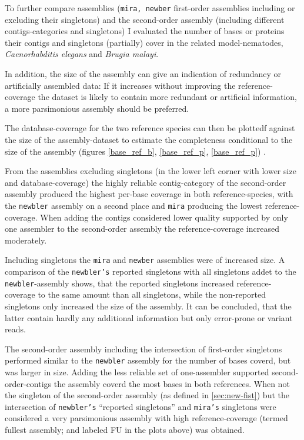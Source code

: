 To further compare assemblies (\texttt{mira, newber} first-order
assemblies including or excluding their singletons) and the
second-order assembly (including different contigs-categories and
singletons) I evaluated the number of bases or proteins their contigs
and singletons (partially) cover in the related model-nematodes,
\textit{Caenorhabditis elegans} and \textit{Brugia malayi}. 

In addition, the size of the assembly can give an indication of
redundancy or artificially assembled data: If it increases without
improving the reference-coverage the dataset is likely to contain
more redundant or artificial information, a more parsimonious assembly
should be preferred.

The database-coverage for the two reference species can then be
plottedf against the size of the assembly-dataset to estimate the
completeness conditional to the size of the assembly (figures
\ref{base_ref_b}, \ref{base_ref_p}, \ref{base_ref_p}) .

From the assemblies excluding singletons (in the lower left corner
with lower size and database-coverage) the highly reliable
contig-category of the second-order assembly produced the highest
per-base coverage in both reference-species, with the \texttt{newbler}
assembly on a second place and \texttt{mira} producing the lowest
reference-coverage. When adding the contigs considered lower quality
supported by only one assembler to the second-order assembly the
reference-coverage increased moderately.

Including singletons the \texttt{mira} and \texttt{newber} assemblies
were of increased size. A comparison of the \texttt{newbler's}
reported singletons with all singletons addet to the
\texttt{newbler}-assembly shows, that the reported singletons
increased reference-coverage to the same amount than all singletons,
while the non-reported singletons only increased the size of the
assembly. It can be concluded, that the latter contain hardly any
additional information but only error-prone or variant reads.

The second-order assembly including the intersection of first-order
singletons performed similar to the \texttt{newbler} assembly for the
number of bases coverd, but was larger in size. Adding the less
reliable set of one-assembler supported second-order-contigs the
assembly coverd the most bases in both references. When not the
singleton of the second-order assembly (as defined in
\ref{sec:new-fist}) but the intersection of \texttt{newbler's}
``reported singletons'' and \texttt{mira's} singletons were considered
a very parsimonious assembly with high reference-coverage (termed
fullest assembly; and labeled FU in the plots above) was obtained.


